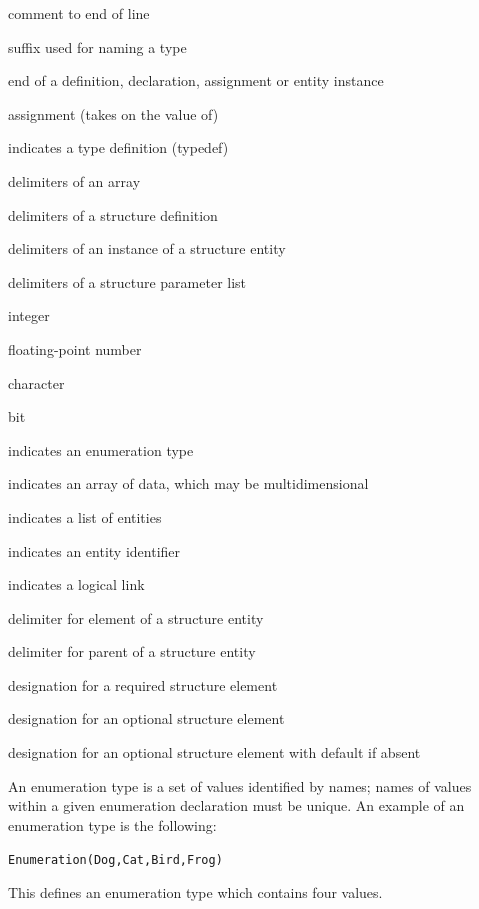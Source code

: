 \begin{Ventryic}{}
\item [\fort{!}]
      comment to end of line
\item [\fort{\_t}]
      suffix used for naming a type
\item [\fort{;}]
      end of a definition, declaration, assignment or entity instance
\item [\fort{=}]
      assignment (takes on the value of)
\item [\fort{:=}]
      indicates a type definition (typedef)
\item [\fort{[ ]}]
      delimiters of an array
\item [\fort{\{ \}}]
      delimiters of a structure definition
\item [\fort{\{\{ \}\}}]
      delimiters of an instance of a structure entity
\item [\fort{< >}]
      delimiters of a structure parameter list
\item [\fort{int}]
      integer
\item [\fort{real}]
      floating-point number
\item [\fort{char}]
      character
\item [\fort{bit}]
      bit
\item [\fort{Enumeration( )}]
      indicates an enumeration type
\item [\fort{Data( )}]
      indicates an array of data, which may be multidimensional
\item [\fort{List( )}]
      indicates a list of entities
\item [\fort{Identifier( )}]
      indicates an entity identifier
\item [\fort{LogicalLink( )}]
      indicates a logical link
\item [\fort{/}]
      delimiter for element of a structure entity
\item [\fort{../}]
      delimiter for parent of a structure entity
\item [\fort{(r)}]
      designation for a required structure element
\item [\fort{(o)}]
      designation for an optional structure element
\item [\fort{(o/d)}]
      designation for an optional structure element with default if absent
\end{Ventryic} 

An enumeration type is a set of values identified by names; names of
values within a given enumeration declaration must be unique.  An
example of an enumeration type is the following:
\begin{alltt}
  Enumeration( Dog, Cat, Bird, Frog ) 
\end{alltt}
This defines an enumeration type which contains four values.  

